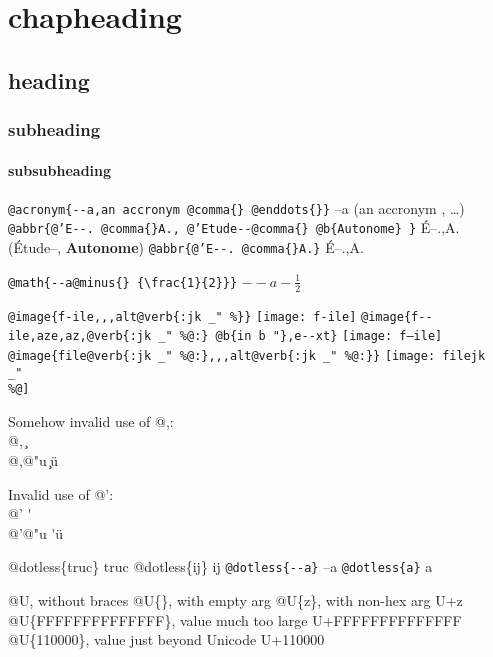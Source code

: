 \documentclass{book}
\newcommand{\GNUTexinfoplaceholder}[1]{}
\newcommand{\GNUTexinfonopagebreakheading}[2]{\let\clearpage\relax \let\cleardoublepage\relax \let\thispagestyle\GNUTexinfoplaceholder #1{#2}}
\renewcommand{\includegraphics}[1]{\fbox{FIG #1}}
\begin{document}
\GNUTexinfonopagebreakheading{\chapter*}{chapheading}

\GNUTexinfonopagebreakheading{\section*}{heading}

\GNUTexinfonopagebreakheading{\subsection*}{subheading}

\GNUTexinfonopagebreakheading{\subsubsection*}{subsubheading}


\texttt{@acronym\{{-}{-}a,an accronym @comma\{\} @enddots\{\}\}} --a (an accronym , \dots{})
\texttt{@abbr\{@'E{-}{-}. @comma\{\}A., @'Etude{-}{-}@comma\{\} @b\{Autonome\} \}} \'{E}--.\@ ,A.\@ (\'{E}tude--, \textbf{Autonome})
\texttt{@abbr\{@'E{-}{-}. @comma\{\}A.\}} \'{E}--.\@ ,A.\@

\texttt{@math\{{-}{-}a@minus\{\} \{\textbackslash{}frac\{1\}\{2\}\}\}} $--a- {\frac{1}{2}}$

\texttt{@image\{f-ile,,,alt@verb\{:jk \_" \%\@\}\}} \texttt{[image: f-ile]}
\texttt{@image\{f{-}{-}ile,aze,az,@verb\{:jk \_" \%@:\} @b\{in b "\},e{-}{-}xt\}} \texttt{[image: f--ile]}
\texttt{@image\{file@verb\{:jk \_" \%@:\},,,alt@verb\{:jk \_" \%@:\}\}} \texttt{[image: filejk \\\_" \\\%@]}




Somehow invalid use of @,:\leavevmode{}\\
@, \c{}
\leavevmode{}\\
@,@"u \c{}\"{u}

Invalid use of @':\leavevmode{}\\
@' \'{}
\leavevmode{}\\
@'@"u \'{}\"{u}

@dotless\{truc\} truc
@dotless\{ij\} ij
\texttt{@dotless\{{-}{-}a\}} --a
\texttt{@dotless\{a\}} a

@U, without braces @U\{\}, with empty arg 
@U\{z\}, with non-hex arg U+z
@U\{FFFFFFFFFFFFFF\}, value much too large U+FFFFFFFFFFFFFF
@U\{110000\}, value just beyond Unicode U+110000
\end{document}
